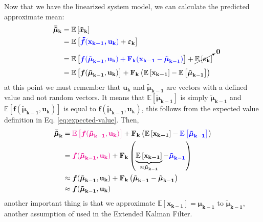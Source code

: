 \documentclass[12pt]{article}
\newcommand{\bvec}[1]{\boldsymbol{\mathbf{#1}}} %
\newcommand{\mat}[1]{\boldsymbol{\mathbf{#1}}}
\newcommand{\brac}[1]{\left[#1\right]} %
\newcommand{\parentheses}[1]{\left(#1\right)}
\newcommand{\mb}[1]{{\boldsymbol{#1}}} %
\newcommand{\expv}[1]{\mathbb{E}\brac{#1}} %
\newcommand{\blue}[1]{\color{blue}#1\color{black}}
\newcommand{\magenta}[1]{\color{magenta}#1\color{black}}
\begin{document}
Now that we have the linearized system model, we can calculate the predicted approximate mean:
\begin{equation*}
\begin{aligned}
    \mb{\bar{\tilde{\mu}}_\mathbf{k}} &= \expv{\mb{\tilde{x}}_\mathbf{k}} \\
    &= \expv{\blue{\mb{\tilde{f}}(\bvec{x_{k-1}, u_k})} + \mb{\varepsilon}_\mathbf{k}}\\
    &= \expv{\blue{\mb{f}(\mb{\tilde\mu}_\mathbf{k-1}, \bvec{u_k}) + \mat{F_k} (\bvec{x_{k-1}} - \mb{\tilde\mu}_\mathbf{k-1})}} + \cancelto{\bvec{0}}{\expv{\mb{\varepsilon}_\mathbf{k}}} \\
    &= \expv{\mb{f}(\mb{\tilde\mu}_\mathbf{k-1}, \bvec{u_k})} + \mat{F_k}\parentheses{\expv{\bvec{x_{k-1}}} - \expv{\mb{\tilde\mu}_\mathbf{k-1}}}
\end{aligned}
\end{equation*}
at this point we must remember that $\bvec{u_k}$ and $\mb{\tilde\mu}_\mathbf{k-1}$ are vectors with a defined value and not random vectors. It means that $\expv{\mb{\tilde\mu}_\mathbf{k-1}}$ is simply $\mb{\tilde\mu}_\mathbf{k-1}$ and $\expv{\mb{f}\parentheses{\mb{\tilde\mu}_\mathbf{k-1}, \bvec{u_k}}}$ is equal to $\mb{f}\parentheses{\mb{\tilde\mu}_\mathbf{k-1}, \bvec{u_k}}$, this follows from the expected value definition in Eq. \ref{eq:expected-value}. Then,
\begin{equation}
    \begin{aligned}
        \mb{\bar{\tilde\mu}}_\mathbf{k} &=    \magenta{\expv{\mb{f}(\mb{\tilde\mu}_\mathbf{k-1}, \bvec{u_k})}} + \mat{F_k}\parentheses{\expv{\bvec{x_{k-1}}} - \blue{\expv{\mb{\tilde\mu}_\mathbf{k-1}}}}\\
        &= \magenta{\mb{f}(\mb{\tilde\mu}_\mathbf{k-1}, \bvec{u_k})} + \mat{F_k}\parentheses{\underbrace{\expv{\bvec{x_{k-1}}}}_{\approx\mb{\tilde\mu}_\mathbf{k-1}} - \blue{\mb{\tilde\mu}_\mathbf{k-1}}}\\
        &\approx \mb{f}(\mb{\tilde\mu}_\mathbf{k-1}, \bvec{u_k}) + \mat{F_k}\parentheses{\mb{\tilde\mu}_\mathbf{k-1} - \mb{\tilde\mu}_\mathbf{k-1}}\\
        &\approx \mb{f}(\mb{\tilde\mu}_\mathbf{k-1}, \bvec{u_k})
    \end{aligned}
\label{eq:ekf-mean-prediction}
\end{equation}
another important thing is that we approximate $\expv{\bvec{x_{k-1}}} = \mb{\mu}_\mathbf{k-1}$ to $\mb{\tilde\mu}_\mathbf{k-1}$, another assumption of used in the Extended Kalman Filter.
\end{document}
